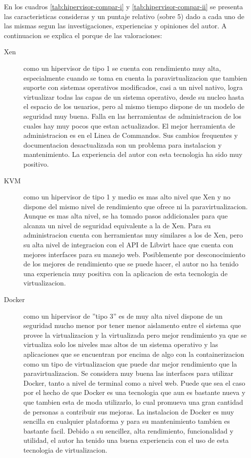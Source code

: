 En los cuadros \ref{tab:hipervisor-compar-i} y \ref{tab:hipervisor-compar-ii} se presenta las caracteristicas consideras y un puntaje relativo (sobre 5) dado a cada uno de las mismas segun las investigaciones, experiencias y opiniones del autor. A continuacion se explica el porque de las valoraciones:
\begin{description}
	\item[Xen] como un hipervisor de tipo 1 se cuenta con rendimiento muy alta, especialmente cuando se toma en cuenta la paravirtualizacion que tambien suporte con sistemas operativos modificados, casi a un nivel nativo, logra virtualizar todas las capas de un sistema operativo, desde su nucleo hasta el espacio de los usuarios, pero al mismo tiempo dispone de un modelo de seguridad muy buena. Falla en las herramientas de administracion de los cuales hay muy pocos que estan actualizados. El mejor herramienta de administracion es en el Linea de Commandos. Sus cambios frequentes y documentacion desactualizada son un problema para instalacion y mantenimiento. La experiencia del autor con esta tecnologia ha sido muy positivo.
    \item[KVM] como un hipervisor de tipo 1 y medio es mas alto nivel que Xen y no dispone del mismo nivel de rendimiento que ofrece ni la paravirtualizacion. Aunque es mas alta nivel, se ha tomado pasos addicionales para que alcanza un nivel de seguridad equivalente a la de Xen. Para su administracion cuenta con herramientas muy similares a los de Xen, pero su alta nivel de integracion con el API de Libvirt hace que cuenta con mejores interfaces para su manejo web. Posiblemente por desconocimiento de los mejores de rendimiento que se puede hacer, el autor no ha tenido una experiencia muy positiva con la aplicacion de esta tecnologia de virtualizacion.
    \item[Docker] como un hipervisor de ''tipo 3'' es de muy alta nivel dispone de un seguridad mucho menor por tener menor aislamento entre el sistema que provee la virtualizacion y la virtualizada pero mejor rendimiento ya que se virtualiza solo los niveles mas altos de un sistema operativo y las aplicaciones que se encuentran por encima de algo con la containerizacion como un tipo de virtualizacion que puede dar mejor rendimiento que la paravirtualizacion. Se considera muy buena las interfaces para utilizar Docker, tanto a nivel de terminal como a nivel web. Puede que sea el caso por el hecho de que Docker es una tecnologia que aun es bastante nueva y que tambien esta de moda utilizarlo, lo cual promueva una gran cantidad de personas a contribuir sus mejoras. La instalacion de Docker es muy sencilla en cualquier plataforma y para su mantenimiento tambien es bastante facil. Debido a su sencillez, alta rendimiento, funcionalidad y utilidad, el autor ha tenido una buena experiencia con el uso de esta tecnologia de virtualizacion. 
\end{description}

